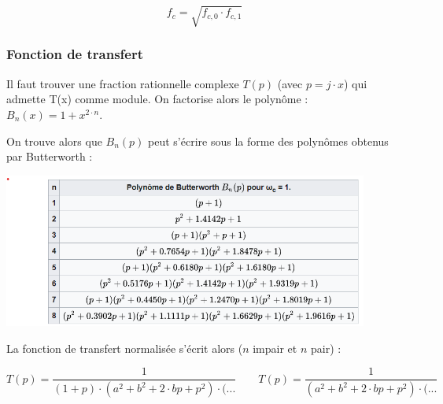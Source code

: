 \documentclass[a4paper,french]{paper}
\begin{document}
$$f_c = \sqrt{f_{c,0} \cdot f_{c,1}} $$


\subsubsection*{Fonction de transfert}

Il faut trouver une fraction rationnelle complexe $T(p)$ (avec $p=j\cdot x$) qui admette T(x) comme module. On factorise alors le polynôme : $B_n(x) = 1 + x^{2\cdot n}$. 

On trouve alors que $B_n(p)$ peut s'écrire sous la forme des polynômes obtenus par Butterworth :

\begin{center}
	\includegraphics[width=12cm]{images/polynomes_butter.png}
\end{center}


La fonction de transfert normalisée s'écrit alors ($n$ impair et $n$ pair) :

$$ T(p) = \frac{1}{(1 + p) \cdot (a^2 + b^2 + 2\cdot b p + p^2) \cdot (...} \qquad  T(p) = \frac{1}{(a^2 + b^2 + 2\cdot b p + p^2) \cdot (...} $$
\end{document}
